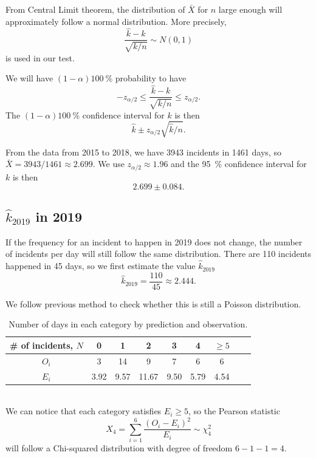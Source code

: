 \documentclass[11pt,a4paper,english]{article}
\begin{document}
From Central Limit theorem, the distribution of $\bar{X}$ for $n$ large enough will approximately follow a normal distribution. More precisely,
\begin{equation*}
	\frac{\hat{k}-k}{\sqrt{k/n}} \sim N(0,1)
\end{equation*}
is used in our test. 

We will have $(1-\alpha)\SI{100}{\percent}$ probability to have 
\begin{equation*}
	-z_{\alpha/2} \leq \frac{\hat{k}-k}{\sqrt{k/n}} \leq z_{\alpha/2}.
\end{equation*}
The $(1-\alpha)\SI{100}{\percent}$ confidence interval for $k$ is then 
\begin{equation*}
	\hat{k} \pm z_{\alpha/2}\sqrt{\hat{k}/n}.
\end{equation*}

From the data from 2015 to 2018, we have 3943 incidents in 1461 days, so $\bar{X} = 3943/1461 \approx 2.699$. We use $z_{\alpha/2} \approx 1.96$ and the \SI{95}{\percent} confidence interval for $k$ is then 
\begin{equation*}
	2.699 \pm 0.084.
\end{equation*}

\subsection{$\hat{k}_{2019}$ in 2019}
If the frequency for an incident to happen in 2019 does not change, the number of incidents per day will still follow the same distribution. There are 110 incidents happened in 45 days, so we first estimate the value $\hat{k}_{2019}$
\begin{equation*}
	\hat{k}_{2019} = \frac{110}{45} \approx 2.444.
\end{equation*}

We follow previous method to check whether this is still a Poisson distribution.
\begin{table}[htbp]
	\centering
	\begin{tabular}{c|cccccccc}
		\hline
		\# of incidents, $N$ & 0 & 1 & 2 & 3 & 4 & $\geq 5$\\
		\hline
		$O_{i}$ & 3 & 14 & 9 & 7 & 6 & 6\\
		\hline
		$E_{i}$ & 3.92 & 9.57 & 11.67 & 9.50 & 5.79 & 4.54\\
		\hline
	\end{tabular}
	\caption{Number of days in each category by prediction and observation.}
\end{table}
\\We can notice that each category satisfies $E_{i} \geq 5$, so the Pearson statistic 
\begin{equation*}
X_{4} = \sum_{i = 1}^{6}\frac{(O_{i}-E_{i})^{2}}{E_{i}} \sim \chi^{2}_{4}
\end{equation*}
will follow a Chi-squared distribution with degree of freedom $6-1-1 = 4$.
\end{document}
